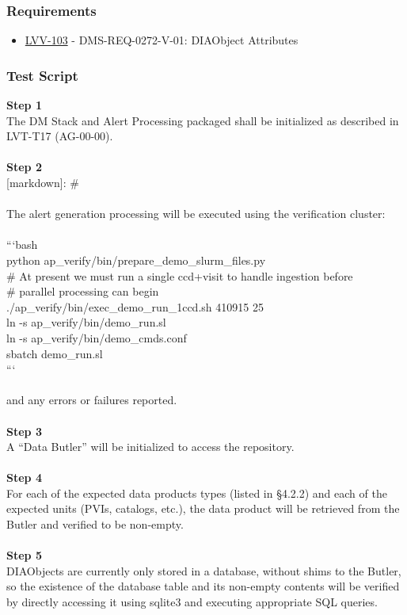 \hypertarget{requirements-29}{%
\subsubsection{Requirements}\label{requirements-29}}

\begin{itemize}
\tightlist
\item
  \href{https://jira.lsstcorp.org/browse/LVV-103}{LVV-103} -
  DMS-REQ-0272-V-01: DIAObject Attributes
\end{itemize}

\hypertarget{test-script-29}{%
\subsubsection{Test Script}\label{test-script-29}}

\textbf{Step 1}\\
The DM Stack and Alert Processing packaged shall be initialized as
described in LVT-T17 (AG-00-00).\\
~\\
\textbf{Step 2}\\
{[}markdown{]}: \#\\
~\\
The alert generation processing will be executed using the verification
cluster:\\
~\\
```bash\\
python ap\_verify/bin/prepare\_demo\_slurm\_files.py\\
\# At present we must run a single ccd+visit to handle ingestion
before\\
\# parallel processing can begin\\
./ap\_verify/bin/exec\_demo\_run\_1ccd.sh 410915 25\\
ln -s ap\_verify/bin/demo\_run.sl\\
ln -s ap\_verify/bin/demo\_cmds.conf\\
sbatch demo\_run.sl\\
```\\
~\\
and any errors or failures reported.\\
~\\
\textbf{Step 3}\\
A ``Data Butler'' will be initialized to access the repository.\\
~\\
\textbf{Step 4}\\
For each of the expected data products types (listed in §4.2.2) and each
of the expected units (PVIs, catalogs, etc.), the data product will be
retrieved from the Butler and verified to be non-empty.\\
~\\
\textbf{Step 5}\\
DIAObjects are currently only stored in a database, without shims to the
Butler, so the existence of the database table and its non-empty
contents will be verified by directly accessing it using sqlite3 and
executing appropriate SQL queries.\\
~\\

